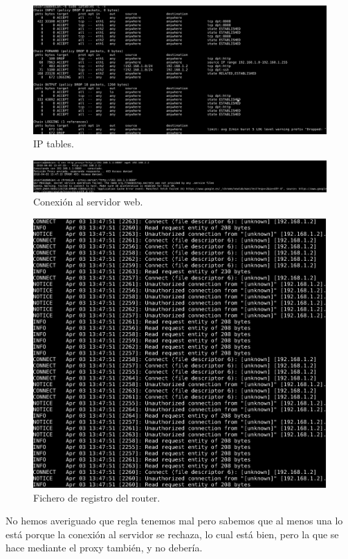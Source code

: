 \documentclass[11pt]{article}
\begin{document}
    \begin{figure}[H]
      \centering
      \includegraphics[width = \textwidth]{iptables4}
      \caption{IP tables.}
    \end{figure}

    \begin{figure}[H]
      \centering
      \includegraphics[width = \textwidth]{web}
      \caption{Conexión al servidor web.}
    \end{figure}

    \begin{figure}[H]
      \centering
      \includegraphics[width = \textwidth]{registro}
      \caption{Fichero de registro del router.}
    \end{figure}

    \bigskip
    \par
    No hemos averiguado que regla tenemos mal pero sabemos que al menos una lo
    está porque la conexión al servidor se rechaza, lo cual está bien, pero la
    que se hace mediante el proxy también, y no debería.
\end{document}

